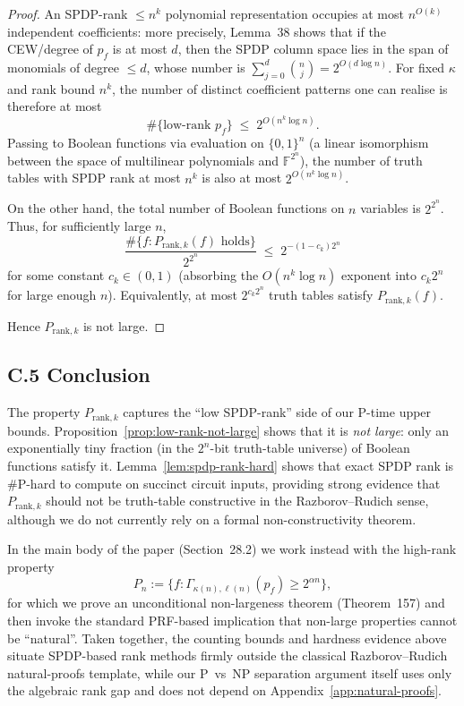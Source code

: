\documentclass[12pt]{article}
\theoremstyle{definition}
\theoremstyle{definition}
\theoremstyle{remark}
\theoremstyle{remark}
\begin{document}
\begin{proof}
An SPDP-rank $\le n^k$ polynomial representation occupies at most $n^{O(k)}$
independent coefficients: more precisely, Lemma~38 shows that if the CEW/degree of
$p_f$ is at most $d$, then the SPDP column space lies in the span of monomials of degree
$\le d$, whose number is $\sum_{j=0}^d \binom{n}{j} = 2^{O(d \log n)}$. For fixed $\kappa$ and
rank bound $n^k$, the number of distinct coefficient patterns one can realise is therefore
at most
\[
  \#\{\text{low-rank } p_f\}
  \;\le\;
  2^{O(n^k \log n)}.
\]
Passing to Boolean functions via evaluation on $\{0,1\}^n$ (a linear isomorphism between
the space of multilinear polynomials and $\mathbb{F}^{2^n}$), the number of truth tables
with SPDP rank at most $n^k$ is also at most $2^{O(n^k \log n)}$.

On the other hand, the total number of Boolean functions on $n$ variables is
$2^{2^n}$. Thus, for sufficiently large $n$,
\[
  \frac{
    \#\{ f : P_{\mathrm{rank},k}(f) \text{ holds}\}
  }{
    2^{2^n}
  }
  \;\le\;
  2^{- (1 - c_k) 2^n}
\]
for some constant $c_k \in (0,1)$ (absorbing the $O(n^k \log n)$ exponent into
$c_k 2^n$ for large enough $n$). Equivalently, at most $2^{c_k 2^n}$ truth tables satisfy
$P_{\mathrm{rank},k}(f)$.

Hence $P_{\mathrm{rank},k}$ is not large.
\end{proof}

\subsection*{C.5 Conclusion}

The property $P_{\mathrm{rank},k}$ captures the ``low SPDP-rank'' side of our P-time
upper bounds. Proposition~\ref{prop:low-rank-not-large} shows that it is \emph{not large}:
only an exponentially tiny fraction (in the $2^n$-bit truth-table universe) of Boolean
functions satisfy it. Lemma~\ref{lem:spdp-rank-hard} shows that exact SPDP rank is
\#P-hard to compute on succinct circuit inputs, providing strong evidence that
$P_{\mathrm{rank},k}$ should not be truth-table constructive in the Razborov--Rudich sense,
although we do not currently rely on a formal non-constructivity theorem.

In the main body of the paper (Section~28.2) we work instead with the high-rank property
\[
  P_n := \{ f : \Gamma_{\kappa(n),\ell(n)}(p_f) \ge 2^{\alpha n} \},
\]
for which we prove an unconditional non-largeness theorem (Theorem~157) and then invoke
the standard PRF-based implication that non-large properties cannot be ``natural''.
Taken together, the counting bounds and hardness evidence above situate SPDP-based rank
methods firmly outside the classical Razborov--Rudich natural-proofs template, while our
P~vs~NP separation argument itself uses only the algebraic rank gap and does not depend
on Appendix~\ref{app:natural-proofs}.
\end{document}
